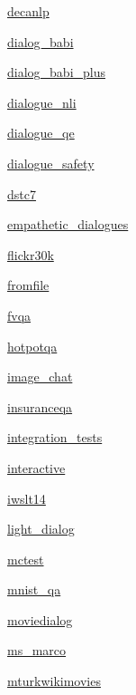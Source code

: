 \begin{DoxyCompactItemize}
 \hyperlink{namespaceparlai_1_1tasks_1_1decanlp}{decanlp}
\item 
 \hyperlink{namespaceparlai_1_1tasks_1_1dialog__babi}{dialog\+\_\+babi}
\item 
 \hyperlink{namespaceparlai_1_1tasks_1_1dialog__babi__plus}{dialog\+\_\+babi\+\_\+plus}
\item 
 \hyperlink{namespaceparlai_1_1tasks_1_1dialogue__nli}{dialogue\+\_\+nli}
\item 
 \hyperlink{namespaceparlai_1_1tasks_1_1dialogue__qe}{dialogue\+\_\+qe}
\item 
 \hyperlink{namespaceparlai_1_1tasks_1_1dialogue__safety}{dialogue\+\_\+safety}
\item 
 \hyperlink{namespaceparlai_1_1tasks_1_1dstc7}{dstc7}
\item 
 \hyperlink{namespaceparlai_1_1tasks_1_1empathetic__dialogues}{empathetic\+\_\+dialogues}
\item 
 \hyperlink{namespaceparlai_1_1tasks_1_1flickr30k}{flickr30k}
\item 
 \hyperlink{namespaceparlai_1_1tasks_1_1fromfile}{fromfile}
\item 
 \hyperlink{namespaceparlai_1_1tasks_1_1fvqa}{fvqa}
\item 
 \hyperlink{namespaceparlai_1_1tasks_1_1hotpotqa}{hotpotqa}
\item 
 \hyperlink{namespaceparlai_1_1tasks_1_1image__chat}{image\+\_\+chat}
\item 
 \hyperlink{namespaceparlai_1_1tasks_1_1insuranceqa}{insuranceqa}
\item 
 \hyperlink{namespaceparlai_1_1tasks_1_1integration__tests}{integration\+\_\+tests}
\item 
 \hyperlink{namespaceparlai_1_1tasks_1_1interactive}{interactive}
\item 
 \hyperlink{namespaceparlai_1_1tasks_1_1iwslt14}{iwslt14}
\item 
 \hyperlink{namespaceparlai_1_1tasks_1_1light__dialog}{light\+\_\+dialog}
\item 
 \hyperlink{namespaceparlai_1_1tasks_1_1mctest}{mctest}
\item 
 \hyperlink{namespaceparlai_1_1tasks_1_1mnist__qa}{mnist\+\_\+qa}
\item 
 \hyperlink{namespaceparlai_1_1tasks_1_1moviedialog}{moviedialog}
\item 
 \hyperlink{namespaceparlai_1_1tasks_1_1ms__marco}{ms\+\_\+marco}
\item 
 \hyperlink{namespaceparlai_1_1tasks_1_1mturkwikimovies}{mturkwikimovies}

\end{DoxyCompactItemize}
